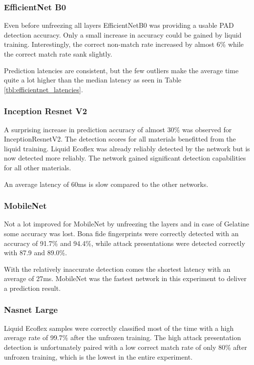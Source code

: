 \newpage
\subsubsection{EfficientNet B0}
Even before unfreezing all layers EfficientNetB0 was providing a usable PAD detection accuracy.
Only a small increase in accuracy could be gained by liquid training.
Interestingly, the correct non-match rate increased by almost 6\% while the correct match rate sank slightly.

Prediction latencies are consistent, but the few outliers make the average time quite a lot higher than the median latency as seen in Table \ref{tbl:efficientnet_latencies}.



\subsubsection{Inception Resnet V2}
A surprising increase in prediction accuracy of almost 30\% was observed for InceptionResnetV2.
The detection scores for all materials benefitted from the liquid training.
Liquid Ecoflex was already reliably detected by the network but is now detected more reliably.
The network gained significant detection capabilities for all other materials.

An average latency of 60ms is slow compared to the other networks.



\subsubsection{MobileNet}
Not a lot improved for MobileNet by unfreezing the layers and in case of Gelatine some accuracy was lost.
Bona fide fingerprints were correctly detected with an accuracy of 91.7\% and 94.4\%, while attack presentations were detected correctly with 87.9 and 89.0\%.

With the relatively inaccurate detection comes the shortest latency with an average of 27ms.
MobileNet was the fastest network in this experiment to deliver a prediction result.



\subsubsection{Nasnet Large}
Liquid Ecoflex samples were correctly classified most of the time with a high average rate of 99.7\% after the unfrozen training.
The high attack presentation detection is unfortunately paired with a low correct match rate of only 80\% after unfrozen training, which is the lowest in the entire experiment.

